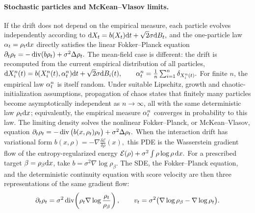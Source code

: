 \paragraph{Stochastic particles and McKean--Vlasov limits.}
If the drift does not depend on the empirical measure, each particle evolves independently according to
\(\mathrm{d} X_t=b(X_t)\mathrm{d} t+\sqrt{2}\sigma\mathrm{d} B_t,\)
and the one-particle law $\alpha_t=\rho_t\mathrm{d} x$ directly satisfies the linear Fokker--Planck equation
\(\partial_t\rho_t=-\operatorname{div}(b\rho_t)+\sigma^2\Delta\rho_t.\)
The mean-field case is different: the drift is recomputed from the current empirical distribution of all particles,
\(\mathrm{d} X_i^n(t)=b(X_i^n(t),\alpha_t^n)\mathrm{d} t+\sqrt{2}\sigma\mathrm{d} B_i(t), \qquad \alpha_t^n=\frac1n\sum_{i=1}^n\delta_{X_i^n(t)}.\)
For finite $n$, the empirical law $\alpha_t^n$ is itself random. Under suitable Lipschitz, growth and chaotic-initialization assumptions, propagation of chaos states that finitely many particles become asymptotically independent as $n\to\infty$, all with the same deterministic law $\rho_t\mathrm{d} x$; equivalently, the empirical measure $\alpha_t^n$ converges in probability to this law. The limiting density solves the nonlinear Fokker--Planck, or McKean--Vlasov, equation
\(\partial_t \rho_t = -\operatorname{div}\big(b(x,\rho_t)\rho_t\big) + \sigma^2\Delta\rho_t.\)
When the interaction drift has variational form
\(b(x,\rho)=-\nabla \frac{\delta \mathcal E}{\delta \rho}(x),\)
this PDE is the Wasserstein gradient flow of the entropy-regularized energy
\(\mathcal E(\rho)+\sigma^2\int \rho\log\rho\,\mathrm{d} x.\)
For a prescribed target $\beta=\rho_\beta\mathrm{d} x$, take $b=\sigma^2\nabla\log\rho_\beta$. The SDE, the Fokker--Planck equation, and the deterministic continuity equation with score velocity are then three representations of the same gradient flow:
\begin{equation}\label{eq-relative-entropy-three-representations}
\partial_t\rho_t
=
\sigma^2\operatorname{div}\!\left(\rho_t\nabla\log\frac{\rho_t}{\rho_\beta}\right),
\qquad
v_t
=
\sigma^2\bigl(\nabla\log\rho_\beta-\nabla\log\rho_t\bigr).
\end{equation}
